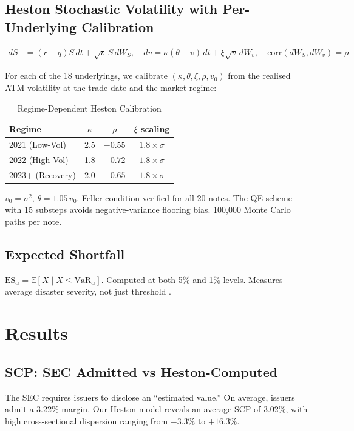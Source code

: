 \documentclass[10pt,a4paper]{article}
\begin{document}
\subsection{Heston Stochastic Volatility with Per-Underlying Calibration}
\vspace{-4pt}\begin{align}
dS &= (r-q)S\,dt + \sqrt{v}\,S\,dW_S,\quad dv = \kappa(\theta-v)\,dt + \xi\sqrt{v}\,dW_v,\quad \text{corr}(dW_S,dW_v)=\rho
\end{align}

For each of the 18 underlyings, we calibrate $(\kappa, \theta, \xi, \rho, v_0)$ from the realised ATM volatility at the trade date and the market regime:
\begin{table}[H]\centering\small
\caption{Regime-Dependent Heston Calibration}
\begin{tabular}{@{}lccc@{}}\toprule
\textbf{Regime}&$\kappa$&$\rho$&$\xi$ scaling\\\midrule
2021 (Low-Vol)&2.5&$-0.55$&$1.8\times\sigma$\\
2022 (High-Vol)&1.8&$-0.72$&$1.8\times\sigma$\\
2023+ (Recovery)&2.0&$-0.65$&$1.8\times\sigma$\\\bottomrule
\end{tabular}\end{table}

$v_0 = \sigma^2$, $\theta = 1.05\,v_0$. Feller condition verified for all 20 notes. The QE scheme \citep{andersen2008} with 15 substeps avoids negative-variance flooring bias. 100,000 Monte Carlo paths per note.

\subsection{Expected Shortfall}
$\text{ES}_\alpha = \mathbb{E}[X \mid X \leq \text{VaR}_\alpha]$. Computed at both 5\% and 1\% levels. Measures average disaster severity, not just threshold \citep{acerbi2002}.

\newpage\section{Results}\label{sec:results}
\subsection{SCP: SEC Admitted vs Heston-Computed}
The SEC requires issuers to disclose an ``estimated value.'' On average, issuers admit a 3.22\% margin. Our Heston model reveals an average SCP of 3.02\%, with high cross-sectional dispersion ranging from $-3.3\%$ to $+16.3\%$.
\end{document}
